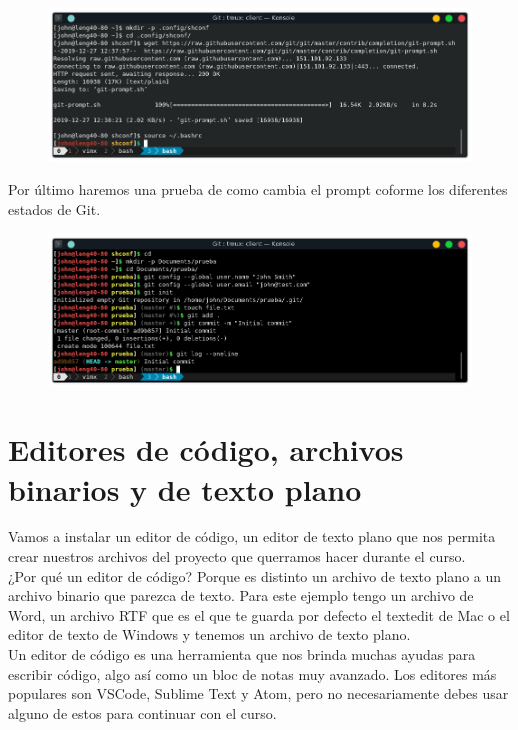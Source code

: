 \documentclass{article}
\begin{document}
\begin{figure}[h!]
  \centering
  \includegraphics[scale=0.75]{./Pictures/043_bashrc_git_ok.png}
\end{figure}

Por último haremos una prueba de como cambia el prompt coforme los diferentes
estados de Git.

\begin{figure}[h!]
  \centering
  \includegraphics[scale=0.75]{./Pictures/044_git_funcional.png}
\end{figure}

\newpage


\section{Editores de código, archivos binarios y de texto plano}%
Vamos a instalar un editor de código, un editor de texto plano que nos permita
crear nuestros archivos del proyecto que querramos hacer durante el curso.\\

¿Por qué un editor de código? Porque es distinto un archivo de texto plano a un
archivo binario que parezca de texto. Para este ejemplo tengo un archivo de
Word, un archivo RTF que es el que te guarda por defecto el textedit de Mac o
el editor de texto de Windows y tenemos un archivo de texto plano.\\

Un editor de código es una herramienta que nos brinda muchas ayudas para
escribir código, algo así como un bloc de notas muy avanzado. Los editores más
populares son VSCode, Sublime Text y Atom, pero no necesariamente debes usar
alguno de estos para continuar con el curso.\\
\end{document}
